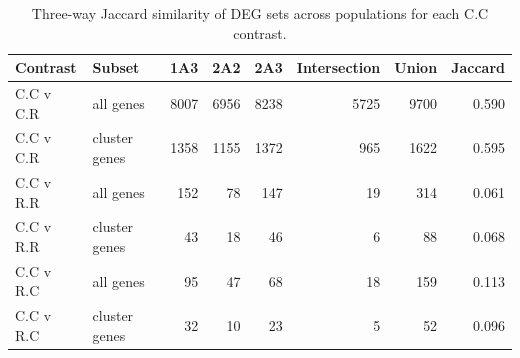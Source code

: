 \begin{table}[!h]
\centering
\caption{\label{tab:jaccard_overlaps}Three-way Jaccard similarity of DEG sets across populations for each C.C contrast.}
\centering
\begin{tabular}[t]{llrrrrrr}
\toprule
Contrast & Subset & 1A3 & 2A2 & 2A3 & Intersection & Union & Jaccard\\
\midrule
C.C v C.R & all genes & 8007 & 6956 & 8238 & 5725 & 9700 & 0.590\\
C.C v C.R & cluster genes & 1358 & 1155 & 1372 & 965 & 1622 & 0.595\\
C.C v R.R & all genes & 152 & 78 & 147 & 19 & 314 & 0.061\\
C.C v R.R & cluster genes & 43 & 18 & 46 & 6 & 88 & 0.068\\
C.C v R.C & all genes & 95 & 47 & 68 & 18 & 159 & 0.113\\
\addlinespace
C.C v R.C & cluster genes & 32 & 10 & 23 & 5 & 52 & 0.096\\
\bottomrule
\end{tabular}
\end{table}

